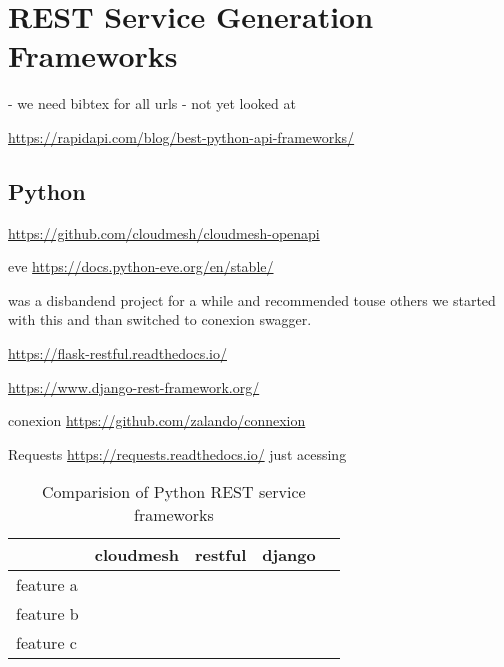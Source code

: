 \section{REST Service Generation Frameworks}

- we need bibtex for all urls
- not yet looked at

\url{https://rapidapi.com/blog/best-python-api-frameworks/}

\subsection{Python}

\begin{description}

\item[cloudmesh]

\url{https://github.com/cloudmesh/cloudmesh-openapi} 

\item {eve} \url{https://docs.python-eve.org/en/stable/}

was a disbandend project for a while and recommended touse others we started with this and than switched to conexion swagger.

\item[restful]

\url{https://flask-restful.readthedocs.io/}

\item[django] \url{https://www.django-rest-framework.org/}

\item{conexion} \url{https://github.com/zalando/connexion}

\item{Requests} \url{https://requests.readthedocs.io/}  just acessing

\end{description}

\begin{table}[htb]

\caption{Comparision of Python REST service frameworks}

\begin{tabular}{|l|l|l|l|l|}
\hline

 & cloudmesh &  restful &  django &  \\ \hline
 feature a &  &  &  &  \\ \hline
 feature b &  &  &  &  \\ \hline
 feature c &  &  &  &  \\ \hline
\end{tabular}

\end{table}

